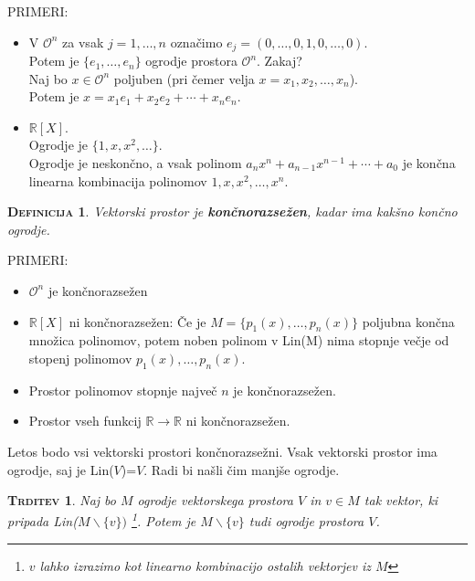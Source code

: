 \documentclass[a4paper,12pt]{article}
\newcommand{\OO}{\mathcal{O}}
\newtheorem*{trditev}{\textsc{Trditev}}
\newtheorem*{definicija}{\textsc{Definicija}}
\begin{document}
\noindent PRIMERI:
\begin{itemize}
\item V $\mathcal{O} ^n$ za vsak $j=1,\ldots,n$ označimo $e_j=(0,\ldots,0,1,0,\ldots,0)$. \\

Potem je $\{e_1,\ldots,e_n\}$ ogrodje prostora $\mathcal{O} ^n$. Zakaj? \\

Naj bo $x\in \OO^n$ poljuben (pri čemer velja $x=x_1,x_2,\ldots,x_n$). \\

Potem je $x=x_1e_1+x_2e_2+\cdots+x_ne_n$.

\item $\mathbb{R}[X]$. \\

Ogrodje je $\{1,x,x^2,\ldots\}$. \\

Ogrodje je neskončno, a vsak polinom  $a_nx^n+a_{n-1}x^{n-1}+\cdots+a_0$ je končna linearna kombinacija polinomov $1,x,x^2,\ldots,x^n$. \\
\end{itemize}

\begin{definicija}
Vektorski prostor je \textbf{končnorazsežen}, kadar ima kakšno končno ogrodje. \\
\end{definicija}

\noindent PRIMERI:
\begin{itemize}
\item $\mathcal{O} ^n$ je končnorazsežen
\item $\mathbb{R}[X]$ ni končnorazsežen: Če je $M=\{p_1(x),\ldots,p_n(x)\}$ poljubna končna množica polinomov, potem noben polinom v Lin(M) nima stopnje večje od stopenj polinomov $p_1(x),\ldots,p_n(x)$. 
\item Prostor polinomov stopnje največ $n$ je končnorazsežen.
\item Prostor vseh funkcij $\mathbb{R}\to \mathbb{R}$ ni končnorazsežen.\\
\end{itemize}

\noindent Letos bodo vsi vektorski prostori končnorazsežni. Vsak vektorski prostor ima ogrodje, saj je Lin($V$)=$V$. Radi bi našli čim manjše ogrodje.\\

\begin{trditev}
Naj bo $M$ ogrodje vektorskega prostora $V$ in $v\in M$ tak vektor, ki \emph{pripada Lin($M\backslash \{v\})$} \footnote{$v$ lahko izrazimo kot linearno kombinacijo ostalih vektorjev iz $M$}. Potem je $M\backslash \{v\}$ tudi ogrodje prostora $V$. \\
\end{trditev}
\end{document}
